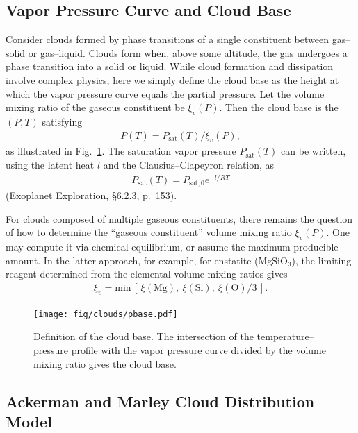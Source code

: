 \subsection*{Vapor Pressure Curve and Cloud Base}

Consider clouds formed by phase transitions of a single constituent between gas–solid or gas–liquid.  
Clouds form when, above some altitude, the gas undergoes a phase transition into a solid or liquid.  
While cloud formation and dissipation involve complex physics, here we simply define the cloud base as the height at which the vapor pressure curve equals the partial pressure.  
Let the volume mixing ratio of the gaseous constituent be $\xi_v(P)$.  
Then the cloud base is the $(P,T)$ satisfying
\begin{align}
P(T) = P_\mathrm{sat}(T)/\xi_v(P),
\end{align}
as illustrated in Fig.~\ref{fig:pbase}.  
The saturation vapor pressure $P_\mathrm{sat}(T)$ can be written, using the latent heat $l$ and the Clausius–Clapeyron relation, as
\begin{align}
P_\mathrm{sat}(T) = P_\mathrm{sat,0} e^{-l/RT}
\end{align}
(Exoplanet Exploration, §6.2.3, p.~153).

For clouds composed of multiple gaseous constituents, there remains the question of how to determine the ``gaseous constituent'' volume mixing ratio $\xi_v(P)$.  
One may compute it via chemical equilibrium, or assume the maximum producible amount.  
In the latter approach, for example, for enstatite ($\mathrm{MgSiO_3}$), the limiting reagent determined from the elemental volume mixing ratios gives
\begin{align}
\xi_v = \mathrm{min}\,[ \,\xi(\mathrm{Mg}),\ \xi(\mathrm{Si}),\ \xi(\mathrm{O})/3 \, ].
\end{align}

\begin{figure}[htb]
\begin{center}
\texttt{[image: fig/clouds/pbase.pdf]}
\caption{Definition of the cloud base. The intersection of the temperature–pressure profile with the vapor pressure curve divided by the volume mixing ratio gives the cloud base. \label{fig:pbase}}
\end{center}
\end{figure}

\subsection*{Ackerman and Marley Cloud Distribution Model}

